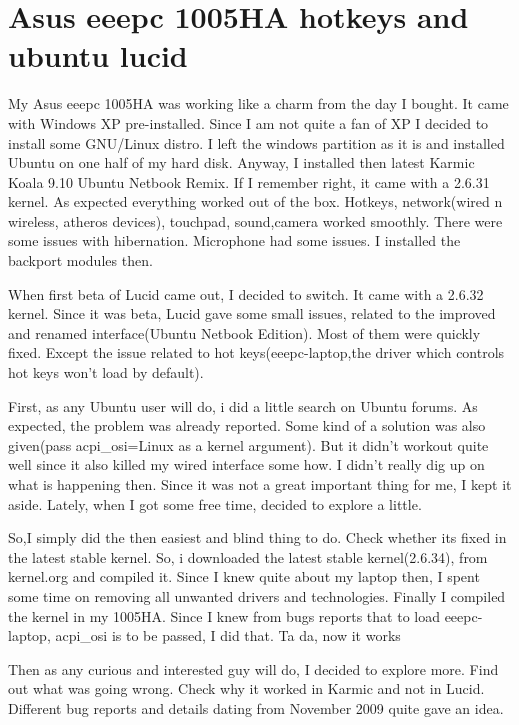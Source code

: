 \section*{Asus eeepc 1005HA hotkeys and ubuntu lucid}
\vskip 2pt


My Asus eeepc 1005HA was working like a charm from the day I bought. 
It came with Windows XP pre-installed. Since I am not quite a fan of XP I 
decided to install some GNU/Linux distro. I left the windows partition as 
it is and installed Ubuntu on one half of my hard disk. Anyway, I installed 
then latest Karmic Koala 9.10 Ubuntu Netbook Remix. If I remember right, it 
came with a 2.6.31 kernel. As expected everything worked out of the box. 
Hotkeys, network(wired n wireless, atheros devices), touchpad, sound,camera 
worked smoothly. There were some issues with hibernation. Microphone had some issues.
I installed the backport modules then.

When first beta of Lucid came out, I decided to switch. It came with a 2.6.32 kernel.
Since it was beta, Lucid gave some small issues, related to the improved and renamed 
interface(Ubuntu Netbook Edition). Most of them were quickly fixed. Except the issue
related to hot keys(eeepc-laptop,the driver which controls hot keys won’t load by default).

First, as any Ubuntu user will do, i did a little search on Ubuntu forums. As expected, 
the problem was already reported. Some kind of a solution was also given(pass acpi\_osi=Linux
as a kernel argument). But it didn’t workout quite well since it also killed my wired interface 
some how. I didn’t really dig up on what is happening then. Since it was not a great important thing
for me, I kept it aside. Lately, when I got some free time, decided to explore a little.

So,I simply did the then easiest and blind thing to do. 
Check whether its fixed in the latest stable kernel. So,
i downloaded the latest stable kernel(2.6.34), from kernel.org 
and compiled it. Since I knew quite about my laptop then, 
I spent some time on removing all unwanted drivers and technologies.
Finally I compiled the kernel in my 1005HA. Since I knew from bugs
reports that to load eeepc-laptop, acpi\_osi is to be passed, I did that. Ta da, now it works 

Then as any curious and interested guy will do, I decided to explore more. 
Find out what was going wrong. Check why it worked in Karmic and not in Lucid.
Different bug reports and details dating from November 2009 quite gave an idea.

